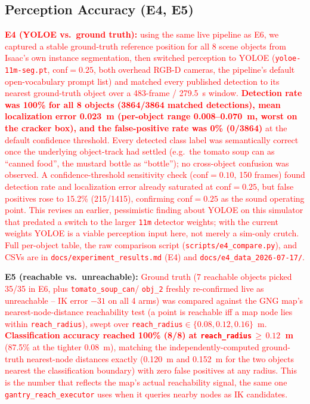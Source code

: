 \documentclass[conference]{IEEEtran}
\begin{document}
\subsection{Perception Accuracy (E4, E5)}
\label{sec:e4}
\textcolor{red}{\textbf{E4 (YOLOE vs.\ ground truth):} using the same live
pipeline as E6, we captured a stable ground-truth reference position for all
8 scene objects from Isaac's own instance segmentation, then switched
perception to YOLOE (\texttt{yoloe-11m-seg.pt}, conf$=0.25$, both overhead
RGB-D cameras, the pipeline's default open-vocabulary prompt list) and
matched every published detection to its nearest ground-truth object over a
483-frame / 279.5~s window. \textbf{Detection rate was 100\% for all 8
objects (3864/3864 matched detections), mean localization error 0.023~m
(per-object range 0.008--0.070~m, worst on the cracker box), and the false-positive
rate was 0\% (0/3864)} at the default confidence threshold. Every detected
class label was semantically correct once the underlying object-track had
settled (e.g.\ the tomato soup can as ``canned food'', the mustard bottle as
``bottle''); no cross-object confusion was observed. A confidence-threshold sensitivity check (conf$=0.10$, 150 frames) found
detection rate and localization error already saturated at conf$=0.25$, but
false positives rose to 15.2\% (215/1415), confirming conf$=0.25$ as the sound
operating point. This revises an earlier, pessimistic finding about YOLOE on
this simulator that predated a switch to the larger \texttt{11m} detector
weights; with the current weights YOLOE is a viable perception input here, not
merely a sim-only crutch. Full per-object table, the raw comparison script
(\texttt{scripts/e4\_compare.py}), and CSVs are in
\texttt{docs/experiment\_results.md} (E4) and
\texttt{docs/e4\_data\_2026-07-17/}.}

\textbf{E5 (reachable vs.\ unreachable):} \textcolor{red}{Ground truth (7
reachable objects picked 35/35 in E6, plus \texttt{tomato\_soup\_can}/
\texttt{obj\_2} freshly re-confirmed live as unreachable -- IK error $-31$ on
all 4 arms) was compared against the GNG map's nearest-node-distance
reachability test (a point is reachable iff a map node lies within
\texttt{reach\_radius}), swept over
\texttt{reach\_radius}$\in\{0.08,0.12,0.16\}$~m. \textbf{Classification
accuracy reached 100\% (8/8) at \texttt{reach\_radius}$\,\geq\,0.12$~m}
(87.5\% at the tighter 0.08~m), matching the independently-computed
ground-truth nearest-node distances exactly (0.120~m and 0.152~m for the two
objects nearest the classification boundary) with zero false positives at
any radius. This is the number that reflects the map's actual reachability
signal, the same one \texttt{gantry\_reach\_executor} uses when it queries
nearby nodes as IK candidates.}
\end{document}
